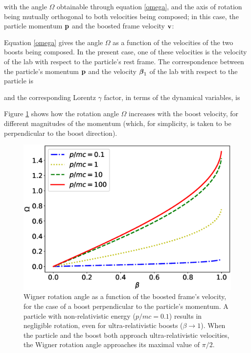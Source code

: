 \documentclass[12pt,a4paper,notitlepage]{report}
\begin{document}
%
with the angle $\Omega$ obtainable through equation \eqref{omega}, and the axis of rotation being mutually orthogonal to both velocities being composed; in this case, the particle momentum $\vb{p}$ and the boosted frame velocity $\vb{v}$:


Equation \eqref{omega} gives the angle $\Omega$ as a function of the velocities of the two boosts being composed. In the present case, one of these velocities is the velocity of the lab with respect to the particle's rest frame. The correspondence between the particle's momentum $\vb{p}$ and the velocity $\vb*{\beta}_1$ of the lab with respect to the particle is

%
and the corresponding Lorentz $\gamma$ factor, in terms of the dynamical variables, is

%
Figure \ref{omega-x-beta} shows how the rotation angle $\Omega$ increases with the boost velocity, for different magnitudes of the momentum (which, for simplicity, is taken to be perpendicular to the boost direction).

\begin{figure}[t]
  \centering
  \includegraphics[width=.6\textwidth]{../Figuras/angulo.eps}
  \captionsetup{font=footnotesize, margin=8pt}
  \caption{Wigner rotation angle as a function of the boosted frame's velocity, for the case of a boost perpendicular to the particle's momentum. A particle with non-relativistic energy ($p/mc = 0.1$) results in negligible rotation, even for ultra-relativistic boosts ($\beta \rightarrow 1$). When the particle and the boost both approach ultra-relativistic velocities, the Wigner rotation angle approaches its maximal value of $\pi/2$.}
  \label{omega-x-beta}
\end{figure}
\end{document}
